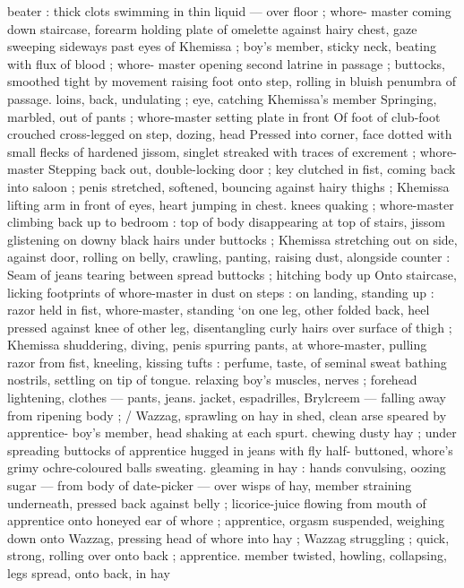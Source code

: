 {beater : thick clots swimming in thin liquid --- over floor ; whore- 
master coming down staircase, forearm holding plate of omelette 
against hairy chest, gaze sweeping sideways past eyes of Khemissa 
; boy's member, sticky neck, beating with flux of blood ; whore- 
master opening second latrine in passage ; buttocks, smoothed tight 
by movement raising foot onto step, rolling in bluish penumbra of 
passage. loins, back, undulating ; eye, catching Khemissa's member 
Springing, marbled, out of pants ; whore-master setting plate in front 
Of foot of club-foot crouched cross-legged on step, dozing, head 
Pressed into corner, face dotted with small flecks of hardened 
jissom, singlet streaked with traces of excrement ; whore-master 
Stepping back out, double-locking door ; key clutched in fist, coming 
back into saloon ; penis stretched, softened, bouncing against hairy 
thighs ; Khemissa lifting arm in front of eyes, heart jumping in chest. 
knees quaking ; whore-master climbing back up to bedroom : top of 
body disappearing at top of stairs, jissom glistening on downy black 
hairs under buttocks ; Khemissa stretching out on side, against door, 
rolling on belly, crawling, panting, raising dust, alongside counter : 
Seam of jeans tearing between spread buttocks ; hitching body up 
Onto staircase, licking footprints of whore-master in dust on steps : 
on landing, standing up : razor held in fist, whore-master, standing 
‘on one leg, other folded back, heel pressed against knee of other 
leg, disentangling curly hairs over surface of thigh ; Khemissa 
shuddering, diving, penis spurring pants, at whore-master, pulling 
razor from fist, kneeling, kissing tufts : perfume, taste, of seminal 
sweat bathing nostrils, settling on tip of tongue. relaxing boy's 
muscles, nerves ; forehead lightening, clothes --- pants, jeans. 
jacket, espadrilles, Brylcreem --- falling away from ripening body ; {\slash} 
Wazzag, sprawling on hay in shed, clean arse speared by apprentice- 
boy's member, head shaking at each spurt. chewing dusty hay ; 
under spreading buttocks of apprentice hugged in jeans with fly half- 
buttoned, whore's grimy ochre-coloured balls sweating. gleaming in 
hay : hands convulsing, oozing sugar --- from body of date-picker --- 
over wisps of hay, member straining underneath, pressed back 
against belly ; licorice-juice flowing from mouth of apprentice onto 
honeyed ear of whore ; apprentice, orgasm suspended, weighing 
down onto Wazzag, pressing head of whore into hay ; Wazzag 
struggling ; quick, strong, rolling over onto back ; apprentice. 
member twisted, howling, collapsing, legs spread, onto back, in hay 
}
